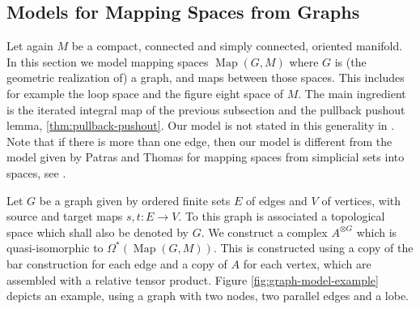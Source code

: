 \documentclass{scrartcl}
\theoremstyle{plain}
\theoremstyle{definition}
\renewcommand{\epsilon}{\varepsilon}
\DeclareMathOperator{\Map}{Map}
\DeclareMathOperator{\Sh}{Sh}
\DeclareMathOperator{\sgn}{sgn}
\begin{document}


\subsection{Models for Mapping Spaces from Graphs}\label{subsec:graph-models}
Let again $M$ be a compact, connected and simply connected, oriented manifold. In this section we model mapping spaces $\Map(G, M)$ where $G$ is (the geometric realization of) a graph, and maps between those spaces. This includes for example the loop space and the figure eight space of $M$. The main ingredient is the iterated integral map of the previous subsection and the pullback pushout lemma, \cref{thm:pullback-pushout}. Our model is not stated in this generality in \cite{naef2019string}. Note that if there is more than one edge, then our model is different from the model given by Patras and Thomas for mapping spaces from simplicial sets into spaces, see \cite{patras2003cochain}.

Let $G$ be a graph given by ordered finite sets $E$ of edges and $V$ of vertices, with source and target maps $s, t\colon E\to V$. To this graph is associated a topological space which shall also be denoted by $G$. We construct a complex $A^{\otimes G}$ which is quasi-isomorphic to $\Omega^*(\Map(G, M))$. This is constructed using a copy of the bar construction for each edge and a copy of $A$ for each vertex, which are assembled with a relative tensor product. Figure \ref{fig:graph-model-example} depicts an example, using a graph with two nodes, two parallel edges and a lobe. 
\end{document}
